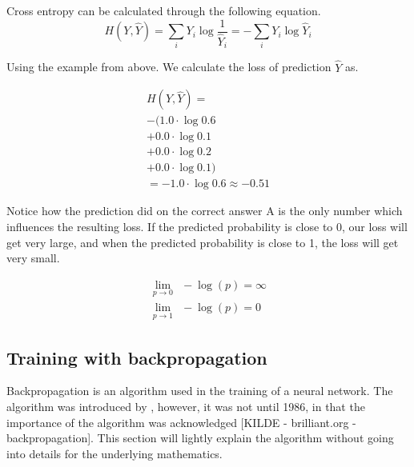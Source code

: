 %
Cross entropy can be calculated through the following equation.
%
\begin{equation} \label{eqn:catcross_ex2}
    H(Y, \hat{Y}) = \sum_i Y_i \log \frac{1}{\hat{Y}_i} = -\sum_i Y_i \log \hat{Y}_i
\end{equation}

Using the example from above. We calculate the loss of prediction $\hat{Y}$ as.

\begin{equation} \label{eqn:catcross_ex3}
\begin{split}
    H(Y, \hat{Y}) = \\
    -( 1.0 \cdot \log 0.6\\
    + 0.0 \cdot \log 0.1\\
    + 0.0 \cdot \log 0.2\\
    + 0.0 \cdot \log 0.1) \\
    = - 1.0 \cdot \log 0.6 \approx -0.51
\end{split}
\end{equation}

Notice how the prediction did on the correct answer A is the only number which influences the resulting loss. If the predicted probability is close to 0, our loss will get very large, and when the predicted probability is close to 1, the loss will get very small.

\begin{equation}
    \begin{split}
            \lim_{p \rightarrow 0}\ \ -\log(p) = \infty \\
            \lim_{p \rightarrow 1}\ \ -\log(p) = 0
    \end{split}
\end{equation}

\subsection{Training with backpropagation}
\label{training_with_backpropagation}

Backpropagation is an algorithm used in the training of a neural network. The algorithm was introduced by \cite{werbos_beyond_1974}, however, it was not until 1986, in \cite{rumelhart_learning_1986} that the importance of the algorithm was acknowledged [KILDE - brilliant.org - backpropagation]. This section will lightly explain the algorithm without going into details for the underlying mathematics. 

